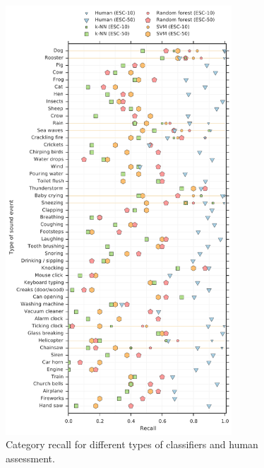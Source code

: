 \documentclass[letterpaper]{sig-alternate}
\begin{document}
\begin{figure}
\centering
\includegraphics[width=20pc]{Figures/figure_recall.pdf}
\caption{\label{fig:recall}Category recall for different types of classifiers and human assessment.}
\vspace{-12pt}
\end{figure}
\end{document}

